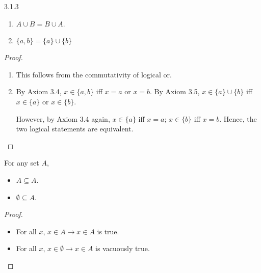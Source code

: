 \begin{exercise}{3.1.3}
\begin{enumerate}
	\item $A \cup B = B \cup A$.
	\item $\{a,b\} = \{a\} \cup \{b\}$
\end{enumerate}
\end{exercise}
\begin{proof}\leavevmode
	\begin{enumerate}
		\item This follows from the commutativity of logical or.
		\item By Axiom 3.4, $x \in \{a,b\}$ iff $x = a$ or $x = b$. By Axiom 3.5, $x \in \{a\} \cup \{b\}$ iff $x \in \{a\}$ or $x \in \{b\}$.
		
		However, by Axiom 3.4 again, $x \in \{a\}$ iff $x = a$; $x \in \{b\}$ iff $x = b$. Hence, the two logical statements are equivalent.
	\end{enumerate}
\end{proof}

\begin{why}{32}
	For any set $A$,
	\begin{itemize}
		\item $A \subseteq A$.
		\item $\emptyset \subseteq A$.
	\end{itemize}
\end{why}
\begin{proof}\leavevmode
	\begin{itemize}
		\item For all $x$, $x \in A \to x \in A$ is true.
		\item For all $x$, $x \in \emptyset \to x \in A$ is vacuously true.
	\end{itemize}
\end{proof}

